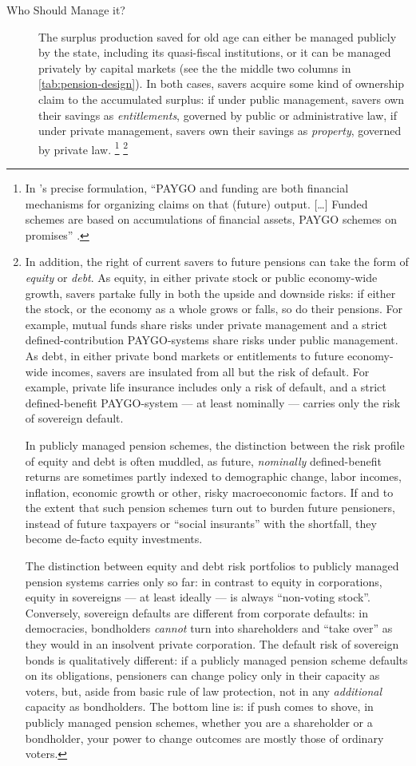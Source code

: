 \begin{description}
	\item[Who Should Manage it?]
	The surplus production saved for old age can either be managed publicly by the state, including its quasi-fiscal institutions, or it can be managed privately by capital markets (see the the middle two columns in \autoref{tab:pension-design}).
	In both cases, savers acquire some kind of ownership claim to the accumulated surplus:
	if under public management, savers own their savings as \emph{entitlements}, governed by public or administrative law, if under private management, savers own their savings as \emph{property}, governed by private law.
	\footnote{
		In \citeauthor{Barr2005a}'s precise formulation, ``PAYGO and funding are both financial mechanisms for organizing claims on that (future) output.
		[\ldots]
		Funded schemes are based on accumulations of financial assets, PAYGO schemes on promises'' \citeyearpar[157]{Barr2005a}.
	}
	\footnote{
		In addition, the right of current savers to future pensions can take the form of \emph{equity} or \emph{debt}.
		As equity, in either private stock or public economy-wide growth, savers partake fully in both the upside and downside risks:
		if either the stock, or the economy as a whole grows or falls, so do their pensions.
		For example, mutual funds share risks under private management and a strict defined-contribution PAYGO-systems share risks under public management.
		As debt, in either private bond markets or entitlements to future economy-wide incomes, savers are insulated from all but the risk of default.
		For example, private life insurance includes only a risk of default, and a strict defined-benefit PAYGO-system --- at least nominally --- carries only the risk of sovereign default.

		In publicly managed pension schemes, the distinction between the risk profile of equity and debt is often muddled, as future, \emph{nominally} defined-benefit returns are sometimes partly indexed to demographic change, labor incomes, inflation, economic growth or other, risky macroeconomic factors.
		If and to the extent that such pension schemes turn out to burden future pensioners, instead of future taxpayers or ``social insurants'' with the shortfall, they become de-facto equity investments.

		The distinction between equity and debt risk portfolios to publicly managed pension systems carries only so far:
		in contrast to equity in corporations, equity in sovereigns --- at least ideally --- is always ``non-voting stock''.
		Conversely, sovereign defaults are different from corporate defaults:
		in democracies, bondholders \emph{cannot} turn into shareholders and ``take over'' as they would in an insolvent private corporation.
		The default risk of sovereign bonds is qualitatively different:
		if a publicly managed pension scheme defaults on its obligations, pensioners can change policy only in their capacity as voters, but, aside from basic rule of law protection, not in any \emph{additional} capacity as bondholders.
		The bottom line is:
		if push comes to shove, in publicly managed pension schemes, whether you are a shareholder or a bondholder, your power to change outcomes are mostly those of ordinary voters.
	}


\end{description}
